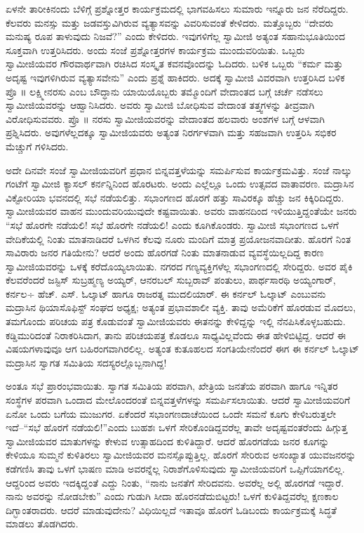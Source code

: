 ಏಳನೇ ತಾರೀಕಿನಂದು ಬೆಳಿಗ್ಗೆ ಪ್ರಶ್ನೋತ್ತರ ಕಾರ್ಯಕ್ರಮದಲ್ಲಿ ಭಾಗವಹಿಸಲು ಸುಮಾರು ಇನ್ನೂರು ಜನ ನೆರೆದಿದ್ದರು. ಕೆಲವರು ಮನಸ್ಸು ಮತ್ತು ಜಡವಸ್ತುವಿಗಿರುವ ವ್ಯತ್ಯಾಸವನ್ನು ವಿವರಿಸುವಂತೆ ಕೇಳಿದರು. ಮತ್ತೊಬ್ಬರು “ದೇವರು ಮನುಷ್ಯ ರೂಪ ತಾಳುವುದು ನಿಜವೆ?” ಎಂದು ಕೇಳಿದರು. ಇವುಗಳಿಗೆಲ್ಲ ಸ್ವಾಮೀಜಿ ಅತ್ಯಂತ ಸಹಾನುಭೂತಿಯಿಂದ ಸೂಕ್ತವಾಗಿ ಉತ್ತರಿಸಿದರು. ಅಂದು ಸಂಜೆ ಪ್ರಶ್ನೋತ್ತರಗಳ ಕಾರ್ಯಕ್ರಮ ಮುಂದುವರಿಯಿತು. ಒಬ್ಬರು ಸ್ವಾಮೀಜಿಯವರ ಗೌರವಾರ್ಥವಾಗಿ ರಚಿಸಿದ ಸಂಸ್ಕೃತ ಕವನವೊಂದನ್ನು ಓದಿದರು. ಬಳಿಕ ಒಬ್ಬರು “ಕರ್ಮ ಮತ್ತು ಅದೃಷ್ಟ ಇವುಗಳಿಗಿರುವ ವ್ಯತ್ಯಾಸವೇನು” ಎಂದು ಪ್ರಶ್ನೆ ಹಾಕಿದರು. ಅದಕ್ಕೆ ಸ್ವಾಮೀಜಿ ವಿವರವಾಗಿ ಉತ್ತರಿಸಿದ ಬಳಿಕ ಪ್ರೊ ॥ ಲಕ್ಷ್ಮೀನರಸು ಎಂಬ ಬೌದ್ಧಾನು ಯಾಯಿಯೊಬ್ಬರು ತಮ್ಮೊಂದಿಗೆ ವೇದಾಂತದ ಬಗ್ಗೆ ಚರ್ಚೆ ನಡೆಸಲು ಸ್ವಾಮೀಜಿಯವರನ್ನು ಆಹ್ವಾನಿಸಿದರು. ಅವರು ಸ್ವಾಮೀಜಿ ಬೋಧಿಸುವ ವೇದಾಂತ ತತ್ತ್ವಗಳನ್ನು ತೀವ್ರವಾಗಿ ವಿರೋಧಿಸುವವರು. ಪ್ರೊ ॥ ನರಸು ಸ್ವಾಮೀಜಿಯವರನ್ನು ವೇದಾಂತದ ಹಲವಾರು ಅಂಶಗಳ ಬಗ್ಗೆ ಆಳವಾಗಿ ಪ್ರಶ್ನಿಸಿದರು. ಅವುಗಳೆಲ್ಲದಕ್ಕೂ ಸ್ವಾಮೀಜಿಯವರು ಅತ್ಯಂತ ನಿರರ್ಗಳವಾಗಿ ಮತ್ತು ಸಹಜವಾಗಿ ಉತ್ತರಿಸಿ ಸಭಿಕರ ಮೆಚ್ಚುಗೆ ಗಳಿಸಿದರು.

ಅದೇ ದಿನವೇ ಸಂಜೆ ಸ್ವಾಮೀಜಿಯವರಿಗೆ ಪ್ರಧಾನ ಬಿನ್ನವತ್ತಳೆಯನ್ನು ಸಮರ್ಪಿಸುವ ಕಾರ್ಯಕ್ರಮವಿತ್ತು. ಸಂಜೆ ನಾಲ್ಕು ಗಂಟೆಗೆ ಸ್ವಾಮೀಜಿ ಕ್ಯಾಸಲ್ ಕರ್ನನ್ನಿನಿಂದ ಹೊರಟರು. ಅಂದು ಎಲ್ಲೆಲ್ಲೂ ಒಂದು ಉತ್ಸವದ ವಾತಾವರಣ. ಮದ್ರಾಸಿನ ವಿಕ್ಟೋರಿಯಾ ಭವನದಲ್ಲಿ ಸಭೆ ನಡೆಯಲಿತ್ತು. ಸಭಾಂಗಣದ ಹೊರಗೆ ಹತ್ತು ಸಾವಿರಕ್ಕೂ ಹೆಚ್ಚು ಜನ ಕಿಕ್ಕಿರಿದಿದ್ದರು. ಸ್ವಾಮೀಜಿಯವರ ವಾಹನ ಮುಂದುವರಿಯುವುದೇ ಕಷ್ಟವಾಯಿತು. ಅವರು ವಾಹನದಿಂದ ಇಳಿಯುತ್ತಿದ್ದಂತೆಯೇ ಜನರು “ಸಭೆ ಹೊರಗೇ ನಡೆಯಲಿ! ಸಭೆ ಹೊರಗೇ ನಡೆಯಲಿ! ಎಂದು ಕೂಗಿಕೊಂಡರು. ಸ್ವಾಮೀಜಿ ಸಭಾಂಗಣದ ಒಳಗೆ ವೇದಿಕೆಯಲ್ಲಿ ನಿಂತು ಮಾತನಾಡಿದರೆ ಒಳಗಿನ ಕೆಲವು ನೂರು ಮಂದಿಗೆ ಮಾತ್ರ ಪ್ರಯೋಜನವಾದೀತು. ಹೊರಗೆ ನಿಂತ ಸಾವಿರಾರು ಜನರ ಗತಿಯೇನು? ಆದರೆ ಅಂದು ಹೊರಗಡೆ ನಿಂತು ಮಾತನಾಡುವ ವ್ಯವಸ್ಥೆಯಿಲ್ಲದಿದ್ದ ಕಾರಣ ಸ್ವಾಮೀಜಿಯವರನ್ನು ಒಳಕ್ಕೆ ಕರೆದೊಯ್ಯಲಾಯಿತು. ನಗರದ ಗಣ್ಯವ್ಯಕ್ತಿಗಳೆಲ್ಲ ಸಭಾಂಗಣದಲ್ಲಿ ಸೇರಿದ್ದರು. ಅವರ ಪೈಕಿ ಕೆಲವರೆಂದರೆ ಜಸ್ಟಿಸ್ ಸುಬ್ರಹ್ಮಣ್ಯ ಅಯ್ಯರ್, ಆನರಬಲ್ ಸುಬ್ಬರಾವ್ ಪಂತುಲು, ಪಾರ್ಥಸಾರಥಿ ಅಯ್ಯಂಗಾರ್, ಕರ್ನಲ÷ ಹೆಚ್. ಎಸ್. ಓಲ್ಕಾಟ್ ಹಾಗೂ ರಾಜರತ್ನ ಮುದಲಿಯಾರ್. ಈ ಕರ್ನಲ್ ಓಲ್ಕಾಟ್ ಎಂಬುವನು ಮದ್ರಾಸಿನ ಥಿಯಾಸೊಫಿಸ್ಟ್ ಸಂಘದ ಅಧ್ಯಕ್ಷ; ಅತ್ಯಂತ ಪ್ರಭಾವಶಾಲೀ ವ್ಯಕ್ತಿ. ತಾವು ಅಮೆರಿಕೆಗೆ ಹೊರಡುವ ಮೊದಲು, ತಮಗೊಂದು ಪರಿಚಯ ಪತ್ರ ಕೊಡುವಂತೆ ಸ್ವಾಮೀಜಿಯವರು ಈತನನ್ನು ಕೇಳಿದ್ದನ್ನು ಇಲ್ಲಿ ನೆನಪಿಸಿಕೊಳ್ಳಬಹುದು. ಕಡ್ಡಿಮುರಿದಂತೆ ನಿರಾಕರಿಸಿದಾಗ, ತಾನು ಪರಿಚಯಪತ್ರ ಕೊಡಲೂ ಸಾಧ್ಯವಿಲ್ಲವೆಂದು ಈತ ಹೇಳಿಬಿಟ್ಟಿದ್ದ. ಆದರೆ ಈ ವಿಷಯಗಳಾವುವೂ ಆಗ ಬಹಿರಂಗವಾಗಿರಲಿಲ್ಲ. ಅತ್ಯಂತ ಕುತೂಹಲದ ಸಂಗತಿಯೇನೆಂದರೆ ಈಗ ಈ ಕರ್ನಲ್ ಓಲ್ಕಾಟ್ ಮದ್ರಾಸಿನ ಸ್ವಾಗತ ಸಮಿತಿಯ ಸದಸ್ಯರಲ್ಲೊಬ್ಬನಾಗಿದ್ದ!

ಅಂತೂ ಸಭೆ ಪ್ರಾರಂಭವಾಯಿತು. ಸ್ವಾಗತ ಸಮಿತಿಯ ಪರವಾಗಿ, ಖೇತ್ರಿಯ ಜನತೆಯ ಪರವಾಗಿ ಹಾಗೂ ಇನ್ನಿತರ ಸಂಸ್ಥೆಗಳ ಪರವಾಗಿ ಒಂದಾದ ಮೇಲೊಂದರಂತೆ ಬಿನ್ನವತ್ತಳೆಗಳನ್ನು ಸಮರ್ಪಿಸಲಾಯಿತು. ಆದರೆ ಸ್ವಾಮೀಜಿಯವರಿಗೆ ಏನೋ ಒಂದು ಬಗೆಯ ಮುಜುಗರ. ಏಕೆಂದರೆ ಸಭಾಂಗಣದಾಚೆಯಿಂದ ಒಂದೇ ಸಮನೆ ಕೂಗು ಕೇಳಿಬರುತ್ತಲೇ ಇದೆ–“ಸಭೆ ಹೊರಗೆ ನಡೆಯಲಿ!”ಎಂದು ಬುಹಶಃ ಒಳಗೆ ಸೇರಿಕೊಂಡಿದ್ದವರೆಲ್ಲ ತಾವೇ ಅದೃಷ್ಟವಂತರೆಂದು ಹಿಗ್ಗುತ್ತ ಸ್ವಾಮೀಜಿಯವರ ಮಾತುಗಳನ್ನು ಕೇಳುವ ಉತ್ಸಾಹದಿಂದ ಕುಳಿತಿದ್ದಾರೆ. ಆದರೆ ಹೊರಗಡೆಯ ಜನರ ಕೂಗನ್ನು ಕೇಳಿಯೂ ಸುಮ್ಮನೆ ಕುಳಿತಿರಲು ಸ್ವಾಮೀಜಿಯವರ ಮನಸ್ಸೊಪ್ಪುತ್ತಿಲ್ಲ. ಹೊರಗೆ ಸೇರಿರುವ ಅಸಂಖ್ಯಾತ ಯುವಜನರನ್ನು ಕಡೆಗಣಿಸಿ ತಾವು ಒಳಗೆ ಭಾಷಣ ಮಾಡಿ ಅವರನ್ನೆಲ್ಲ ನಿರಾಶೆಗೊಳಿಸುವುದು ಸ್ವಾಮೀಜಿಯವರಿಗೆ ಒಪ್ಪಿಗೆಯಾಗಲಿಲ್ಲ. ಆದ್ದರಿಂದ ಅವರು ಇದಕ್ಕಿದ್ದಂತೆ ಎದ್ದು ನಿಂತು, “ನಾನು ಜನತೆಗೆ ಸೇರಿದವನು. ಅವರೆಲ್ಲ ಅಲ್ಲಿ ಹೊರಗಡೆ ಇದ್ದಾರೆ. ನಾನು ಅವರನ್ನು ನೋಡಬೇಕು” ಎಂದು ಗುಡುಗಿ ಸೀದಾ ಹೊರನಡೆದುಬಿಟ್ಟರು! ಒಳಗೆ ಕುಳಿತಿದ್ದವರೆಲ್ಲ ಕ್ಷಣಕಾಲ ದಿಗ್ಭಾಂತರಾದರು. ಆದರೆ ಮಾಡುವುದೇನು? ವಿಧಿಯಿಲ್ಲದೆ ಇತಾವೂ ಹೊರಗೆ ಓಡಿಬಂದು ಕಾರ್ಯಕ್ರಮಕ್ಕೆ ಸಿದ್ಧತೆ ಮಾಡಲು ತೊಡಗಿದರು.

